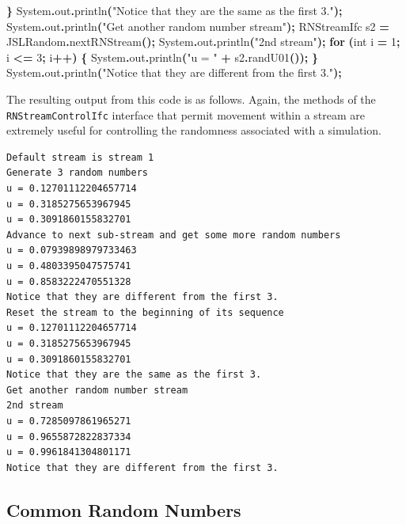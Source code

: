 \documentclass[
]{book}
\newenvironment{Shaded}{\begin{snugshade}}{\end{snugshade}}
\newcommand{\BuiltInTok}[1]{#1}
\newcommand{\ControlFlowTok}[1]{\textcolor[rgb]{0.13,0.29,0.53}{\textbf{#1}}}
\newcommand{\DataTypeTok}[1]{\textcolor[rgb]{0.13,0.29,0.53}{#1}}
\newcommand{\DecValTok}[1]{\textcolor[rgb]{0.00,0.00,0.81}{#1}}
\newcommand{\FunctionTok}[1]{\textcolor[rgb]{0.00,0.00,0.00}{#1}}
\newcommand{\NormalTok}[1]{#1}
\newcommand{\OperatorTok}[1]{\textcolor[rgb]{0.81,0.36,0.00}{\textbf{#1}}}
\newcommand{\StringTok}[1]{\textcolor[rgb]{0.31,0.60,0.02}{#1}}
\theoremstyle{definition}
\theoremstyle{definition}
\theoremstyle{definition}
\theoremstyle{definition}
\theoremstyle{remark}
\begin{document}
\begin{Shaded}
\begin{Highlighting}[]
\OperatorTok{\}}
\BuiltInTok{System}\OperatorTok{.}\FunctionTok{out}\OperatorTok{.}\FunctionTok{println}\OperatorTok{(}\StringTok{"Notice that they are the same as the first 3."}\OperatorTok{);}
\BuiltInTok{System}\OperatorTok{.}\FunctionTok{out}\OperatorTok{.}\FunctionTok{println}\OperatorTok{(}\StringTok{"Get another random number stream"}\OperatorTok{);}
\NormalTok{RNStreamIfc s2 }\OperatorTok{=}\NormalTok{ JSLRandom}\OperatorTok{.}\FunctionTok{nextRNStream}\OperatorTok{();}
\BuiltInTok{System}\OperatorTok{.}\FunctionTok{out}\OperatorTok{.}\FunctionTok{println}\OperatorTok{(}\StringTok{"2nd stream"}\OperatorTok{);}
\ControlFlowTok{for} \OperatorTok{(}\DataTypeTok{int}\NormalTok{ i }\OperatorTok{=} \DecValTok{1}\OperatorTok{;}\NormalTok{ i }\OperatorTok{\textless{}=} \DecValTok{3}\OperatorTok{;}\NormalTok{ i}\OperatorTok{++)} \OperatorTok{\{}
    \BuiltInTok{System}\OperatorTok{.}\FunctionTok{out}\OperatorTok{.}\FunctionTok{println}\OperatorTok{(}\StringTok{"u = "} \OperatorTok{+}\NormalTok{ s2}\OperatorTok{.}\FunctionTok{randU01}\OperatorTok{());}
\OperatorTok{\}}
\BuiltInTok{System}\OperatorTok{.}\FunctionTok{out}\OperatorTok{.}\FunctionTok{println}\OperatorTok{(}\StringTok{"Notice that they are different from the first 3."}\OperatorTok{);}
\end{Highlighting}
\end{Shaded}

The resulting output from this code is as follows. Again, the methods of the \texttt{RNStreamControlIfc} interface that permit movement within a stream are extremely useful for controlling the randomness associated with a simulation.

\begin{verbatim}
Default stream is stream 1
Generate 3 random numbers
u = 0.12701112204657714
u = 0.3185275653967945
u = 0.3091860155832701
Advance to next sub-stream and get some more random numbers
u = 0.07939898979733463
u = 0.4803395047575741
u = 0.8583222470551328
Notice that they are different from the first 3.
Reset the stream to the beginning of its sequence
u = 0.12701112204657714
u = 0.3185275653967945
u = 0.3091860155832701
Notice that they are the same as the first 3.
Get another random number stream
2nd stream
u = 0.7285097861965271
u = 0.9655872822837334
u = 0.9961841304801171
Notice that they are different from the first 3.
\end{verbatim}

\hypertarget{ch2:crn}{%
\subsection{Common Random Numbers}\label{ch2:crn}}
\end{document}
